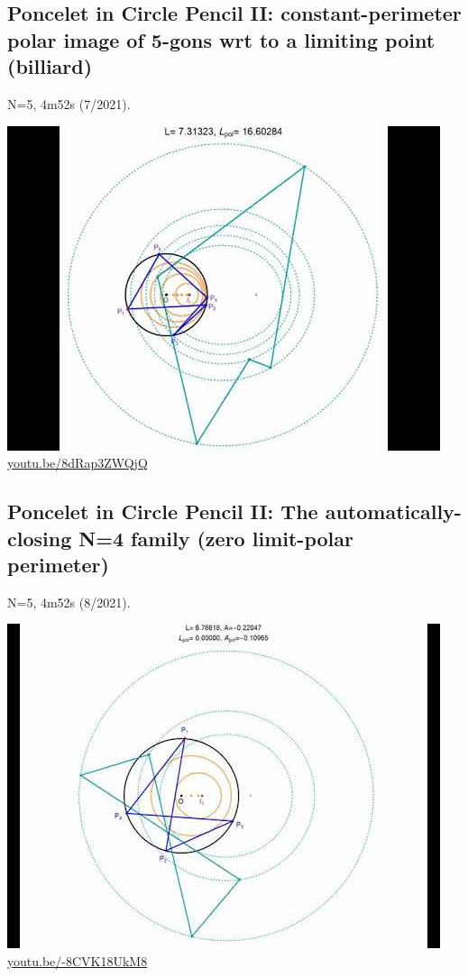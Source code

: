 \documentclass[12pt]{amsart}
\begin{document}
\subsection{Poncelet in Circle Pencil II: constant-perimeter polar image of 5-gons wrt to a limiting point (billiard)}
\label{vid:8dRap3ZWQjQ}
\noindent N=5, 4m52s (7/2021). 
\begin{center}\includegraphics[width=.5\textwidth]{pics/8dRap3ZWQjQ.jpg} \\ 
\href{https://youtu.be/8dRap3ZWQjQ}{\url{youtu.be/8dRap3ZWQjQ}}\end{center}
% 

\subsection{Poncelet in Circle Pencil II: The automatically-closing N=4 family (zero limit-polar perimeter)}
\label{vid:-8CVK18UkM8}
\noindent N=5, 4m52s (8/2021). 
\begin{center}\includegraphics[width=.5\textwidth]{pics/-8CVK18UkM8.jpg} \\ 
\href{https://youtu.be/-8CVK18UkM8}{\url{youtu.be/-8CVK18UkM8}}\end{center}
% 
\end{document}
